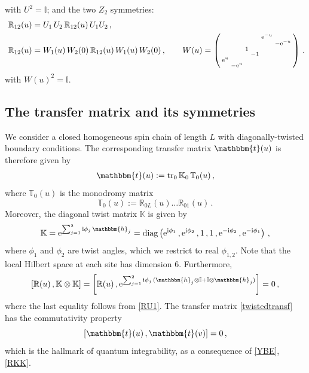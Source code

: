 \documentclass[12pt]{article}
\numberwithin{equation}{section}
\newcommand{\ri}{{\rm i}}
\newcommand{\re}{{\rm e}}
\newcommand{\id}{\mathbb{I}}
\begin{document}
	with $U^2 = \id$;
	and the two $Z_2$ symmetries:
	\begin{align}
		\mathbb{R}_{12}(u) &= U_1\,  U_2\, \mathbb{R}_{12}(u)\, U_1 U_2\,, 
		\label{Usymmetry}\\\
		\mathbb{R}_{12}(u) &= W_1(u)\, W_2(0)\,  \mathbb{R}_{12}(u)\, W_1(u)\, W_2(0)\,, \qquad W(u)= \left(\begin{smallmatrix}
			&  &  &   & \re^{-u} & \\
			&  &  &   &    & -\re^{-u}\\
			&  & 1 &   &    & \\
			&  &  & -1 &    & \\
			\re^{u}&  &  &  &  &   \\
			& -\re^{u} &  &  &  &  
		\end{smallmatrix}\right) \,.
		\label{RWsymmetry}
	\end{align}
	with $W(u)^2 = \id$.
	
	
	\subsection{The transfer matrix and its symmetries}
	
	We consider a closed homogeneous spin chain of length $L$
	with diagonally-twisted boundary conditions.
	The corresponding transfer matrix $\mathbbm{t}(u)$ is therefore given by \cite{Vega84, Skly87}
	\begin{align}
		\mathbbm{t}(u):=\mathrm{tr}_{0}\, \mathbb{K}_0\, \mathbb{T}_0(u)\,,
		\label{twistedtransf}
	\end{align}
	where $\mathbb{T}_{0}(u)$ is the monodromy matrix
	\begin{equation}
		\mathbb{T}_{0}(u):=\mathbb{R}_{0L}(u)\dots \mathbb{R}_{01}(u)\,.
		\label{monodromy}
	\end{equation}
	Moreover, the diagonal twist matrix $\mathbb{K}$ is given by
	\begin{equation}
		\mathbb{K} = \re^{\sum_{j=1}^2 \ri \phi_j\, \mathbbm{h}_j}
		= \text{diag}\left(\re^{\ri \phi_1}\,, \re^{\ri \phi_2}\,,1\,,1\,, \re^{-\ri \phi_2}\,, \re^{-\ri \phi_1}\right)\,,
		\label{twistmatrix}
	\end{equation}
	where $\phi_1$ and $\phi_2$ are twist angles, which we restrict to real $\phi_{1,2}$.
	Note that the local Hilbert space at each site
	has dimension 6. Furthermore,
	\begin{equation}
		\left[ \mathbb{R}(u) \,, \mathbb{K} \otimes \mathbb{K} \right] =  \left[ \mathbb{R}(u) \,,  \re^{\sum_{j=1}^2 \ri \phi_j\, (\mathbbm{h}_j \otimes \id + \id \otimes \mathbbm{h}_j)}\right] = 0 \,,
		\label{RKK}
	\end{equation}
	where the last equality follows from \eqref{RU1}.
	The transfer matrix \eqref{twistedtransf} has the commutativity property
	\begin{equation}
		\left[ \mathbbm{t}(u) \,, \mathbbm{t}(v) \right] = 0 \,,\label{TT}
	\end{equation}
	which is the hallmark of quantum integrability,
	as a consequence of \eqref{YBE}, \eqref{RKK}. 
	
\end{document}
